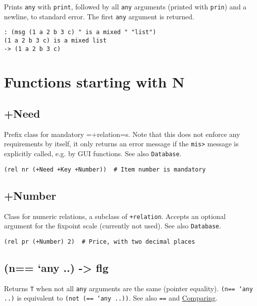 {{{{{{{Prints \texttt{any} with \texttt{print}, followed by all \texttt{any} arguments (printed with
\texttt{prin}) and a newline, to standard error. The first \texttt{any} argument is
returned.


\begin{verbatim}
: (msg (1 a 2 b 3 c) " is a mixed " "list")
(1 a 2 b 3 c) is a mixed list
-> (1 a 2 b 3 c)
\end{verbatim}


\chapter{Functions starting with N}
\label{sec-8-1-14}


 
\section{+Need}
\label{sec-8-1-14-1}


Prefix class for mandatory =+relation=s. Note that this does not enforce
any requirements by itself, it only returns an error message if the
\texttt{mis>} message is explicitly called, e.g. by GUI functions. See also
\texttt{Database}.


\begin{verbatim}
(rel nr (+Need +Key +Number))  # Item number is mandatory
\end{verbatim}

 
\section{+Number}
\label{sec-8-1-14-2}


Class for numeric relations, a subclass of \texttt{+relation}. Accepts an
optional argument for the fixpoint scale (currently not used). See also
\texttt{Database}.


\begin{verbatim}
(rel pr (+Number) 2)  # Price, with two decimal places
\end{verbatim}

 

\section*{(n== `any ..) -> flg}
\label{sec-8-1-14-3}


Returns \texttt{T} when not all \texttt{any} arguments are the same (pointer
equality). \texttt{(n== `any ..)} is equivalent to \texttt{(not (== `any ..))}. See
also \texttt{==} and \hyperref[ref.html-cmp]{Comparing}.


}}}}}}}
